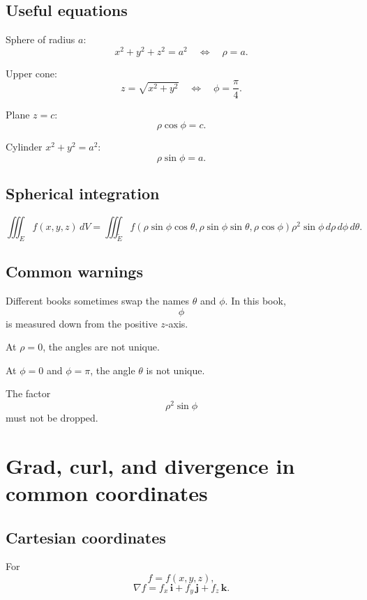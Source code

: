\subsection*{Useful equations}

Sphere of radius \(a\):
\[
\boxed{
    x^2+y^2+z^2=a^2
    \quad\Longleftrightarrow\quad
    \rho=a.
}
\]

Upper cone:
\[
\boxed{
    z=\sqrt{x^2+y^2}
    \quad\Longleftrightarrow\quad
    \phi=\frac{\pi}{4}.
}
\]

Plane \(z=c\):
\[
\boxed{
    \rho\cos\phi=c.
}
\]

Cylinder \(x^2+y^2=a^2\):
\[
\boxed{
    \rho\sin\phi=a.
}
\]

\subsection*{Spherical integration}

\[
\boxed{
    \iiint_E f(x,y,z)\,dV
    =
    \iiint_{\widetilde E}
    f(\rho\sin\phi\cos\theta,\rho\sin\phi\sin\theta,\rho\cos\phi)
    \rho^2\sin\phi\,d\rho\,d\phi\,d\theta.
}
\]

\subsection*{Common warnings}

Different books sometimes swap the names \(\theta\) and \(\phi\).  In this book,
\[
    \phi
\]
is measured down from the positive \(z\)-axis.

At \(\rho=0\), the angles are not unique.

At \(\phi=0\) and \(\phi=\pi\), the angle \(\theta\) is not unique.

The factor
\[
    \rho^2\sin\phi
\]
must not be dropped.

\section{Grad, curl, and divergence in common coordinates}
\label{app:D.4}

\subsection*{Cartesian coordinates}

For
\[
    f=f(x,y,z),
\]
\[
\boxed{
    \nabla f
    =
    f_x\,\mathbf i+f_y\,\mathbf j+f_z\,\mathbf k.
}
\]

